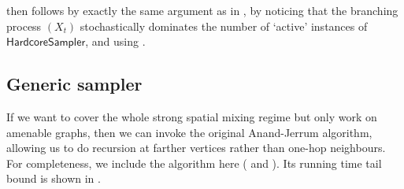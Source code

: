 \documentclass[10pt,a4paper]{article}
\renewcommand{\Pr}{\mathop{\mathrm{Pr}}\nolimits}
\newcommand{\hcsampler}{\mathsf{HardcoreSampler}}
\begin{document}
 then follows by exactly the same argument as in \cite[Proof of Lemma B.10]{FGWWY22}, by noticing that the branching process $(X_t)$ stochastically dominates the number of `active' instances of $\hcsampler$, and using . 


\subsection{Generic sampler}

If we want to cover the whole strong spatial mixing regime but only work on amenable graphs, then we can invoke the original Anand-Jerrum algorithm, allowing us to do recursion at farther vertices rather than one-hop neighbours. 
For completeness, we include the algorithm here ( and ). 
Its running time tail bound is shown in \cite[Lemma B.10]{FGWWY22}. 
\end{document}
